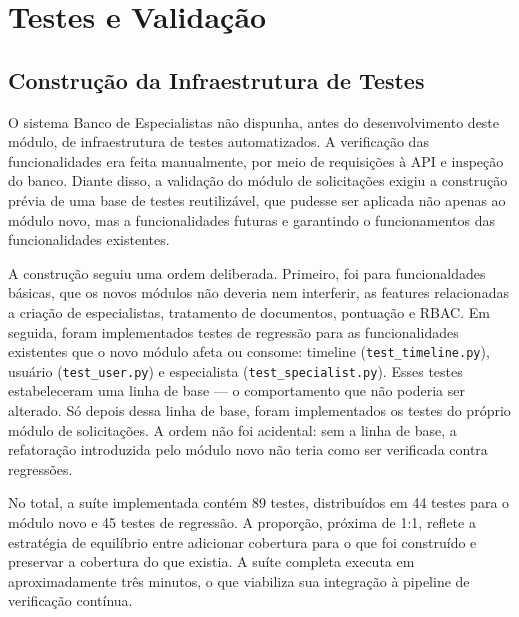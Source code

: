 \section{Testes e Validação}
\label{sec:testes-validacao}

\subsection{Construção da Infraestrutura de Testes}
\label{sec:infraestrutura-testes}

O sistema Banco de Especialistas não dispunha, antes do desenvolvimento deste módulo, de
infraestrutura de testes automatizados. A verificação das funcionalidades era feita
manualmente, por meio de requisições à API e inspeção do banco. Diante disso, a
validação do módulo de solicitações exigiu a construção prévia de uma base de testes
reutilizável, que pudesse ser aplicada não apenas ao módulo novo, mas a funcionalidades
futuras e garantindo o funcionamentos das funcionalidades existentes.

A construção seguiu uma ordem deliberada. Primeiro, foi para funcionaldades básicas, que
os novos módulos não deveria nem interferir, as features relacionadas a criação de
especialistas, tratamento de documentos, pontuação e RBAC. Em seguida, foram
implementados testes de regressão para as funcionalidades existentes que o novo módulo
afeta ou consome: timeline (\texttt{test\_timeline.py}), usuário
(\texttt{test\_user.py}) e especialista (\texttt{test\_specialist.py}). Esses testes
estabeleceram uma linha de base — o comportamento que não poderia ser alterado. Só
depois dessa linha de base, foram implementados os testes do próprio módulo de
solicitações. A ordem não foi acidental: sem a linha de base, a refatoração introduzida
pelo módulo novo não teria como ser verificada contra regressões.


No total, a suíte implementada contém 89 testes, distribuídos em 44 testes para o módulo
novo e 45 testes de regressão. A proporção, próxima de 1:1, reflete a estratégia de
equilíbrio entre adicionar cobertura para o que foi construído e preservar a cobertura
do que existia. A suíte completa executa em aproximadamente três minutos, o que
viabiliza sua integração à pipeline de verificação contínua.

